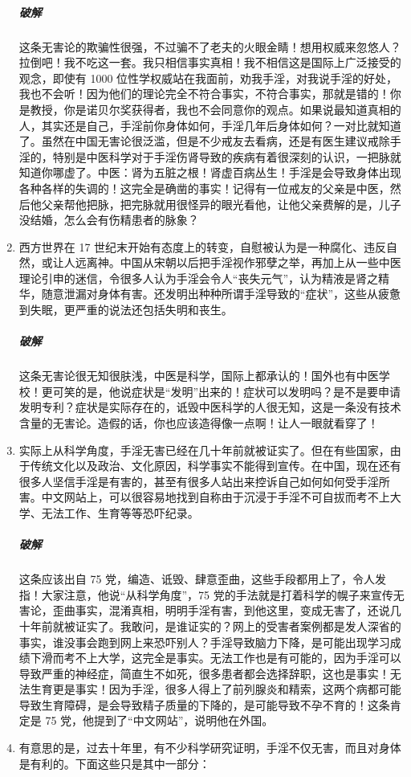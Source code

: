 \begin{enumerate}
    \subparagraph{破解} 这条无害论的欺骗性很强，不过骗不了老夫的火眼金睛！想用权威来忽悠人？拉倒吧！我不吃这一套。我只相信事实真相！我不相信这是国际上广泛接受的观念，即使有 1000 位性学权威站在我面前，劝我手淫，对我说手淫的好处，我也不会听！因为他们的理论完全不符合事实，不符合事实，那就是错的！你是教授，你是诺贝尔奖获得者，我也不会同意你的观点。如果说最知道真相的人，其实还是自己，手淫前你身体如何，手淫几年后身体如何？一对比就知道了。虽然在中国无害论很泛滥，但是不少戒友去看病，还是有医生建议戒除手淫的，特别是中医科学对于手淫伤肾导致的疾病有着很深刻的认识，一把脉就知道你哪虚了。中医：肾为五脏之根！肾虚百病丛生！手淫是会导致身体出现各种各样的失调的！这完全是确凿的事实！记得有一位戒友的父亲是中医，然后他父亲帮他把脉，把完脉就用很怪异的眼光看他，让他父亲费解的是，儿子没结婚，怎么会有伤精患者的脉象？
    \item 西方世界在 17 世纪末开始有态度上的转变，自慰被认为是一种腐化、违反自然，或让人远离神。中国从宋朝以后把手淫视作邪孽之举，再加上从一些中医理论引申的迷信，令很多人认为手淫会令人“丧失元气”，认为精液是肾之精华，随意泄漏对身体有害。还发明出种种所谓手淫导致的“症状”，这些从疲惫到失眠，更严重的说法还包括失明和丧生。
    \subparagraph{破解} 这条无害论很无知很肤浅，中医是科学，国际上都承认的！国外也有中医学校！更可笑的是，他说症状是“发明”出来的！症状可以发明吗？是不是要申请发明专利？症状是实际存在的，诋毁中医科学的人很无知，这是一条没有技术含量的无害论。造假的话，你也应该造得像一点啊！让人一眼就看穿了！
    \item 实际上从科学角度，手淫无害已经在几十年前就被证实了。但在有些国家，由于传统文化以及政治、文化原因，科学事实不能得到宣传。在中国，现在还有很多人坚信手淫是有害的，甚至有很多人站出来控诉自己如何如何受手淫所害。中文网站上，可以很容易地找到自称由于沉浸于手淫不可自拔而考不上大学、无法工作、生育等等恐吓纪录。
    \subparagraph{破解} 这条应该出自 75 党，编造、诋毁、肆意歪曲，这些手段都用上了，令人发指！大家注意，他说“从科学角度”，75 党的手法就是打着科学的幌子来宣传无害论，歪曲事实，混淆真相，明明手淫有害，到他这里，变成无害了，还说几十年前就被证实了。我敢问，是谁证实的？网上的受害者案例都是发人深省的事实，谁没事会跑到网上来恐吓别人？手淫导致脑力下降，是可能出现学习成绩下滑而考不上大学，这完全是事实。无法工作也是有可能的，因为手淫可以导致严重的神经症，简直生不如死，很多患者都会选择辞职，这也是事实！无法生育更是事实！因为手淫，很多人得上了前列腺炎和精索，这两个病都可能导致生育障碍，是会导致精子质量的下降的，是可能导致不孕不育的！这条肯定是 75 党，他提到了“中文网站”，说明他在外国。
    \item 有意思的是，过去十年里，有不少科学研究证明，手淫不仅无害，而且对身体是有利的。下面这些只是其中一部分：\begin{itemize}

\end{itemize}
\end{enumerate}
